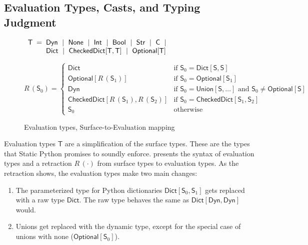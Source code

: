 \documentclass[english,cleveref,submission]{programming}
\makeatletter
\newcommand{\SP}{Static Python}
\newcommand{\defeq}{=}
\newcommand{\mfeq}{=}
\newcommand{\langmid}{~\mid~} %
\newenvironment{langarray}{\(\begin{array}{l@{\hspace{2mm}}c@{\hspace{2mm}}l}}{\end{array}\)}
\newcommand{\typefont}[1]{\mathsf{#1}}
\newcommand{\paramtype}[2]{#1[#2]}
\newcommand{\sptype}{\typefont{S}}
\newcommand{\spteval}{\typefont{T}}
\newcommand{\sptclass}{\typefont{C}}
\newcommand{\sptint}{\typefont{Int}}
\newcommand{\sptstr}{\typefont{Str}}
\newcommand{\sptbool}{\typefont{Bool}}
\newcommand{\sptdyn}{\typefont{Dyn}}
\newcommand{\sptnone}{\typefont{None}}
\newcommand{\sptoptional}[1]{\paramtype{\typefont{Optional}}{#1}}
\newcommand{\sptunion}[1]{\paramtype{\typefont{Union}}{#1}}
\newcommand{\sptrawpydict}{\typefont{Dict}}
\newcommand{\sptrawchkdict}{\typefont{CheckedDict}} %
\newcommand{\sptpydict}[2]{\paramtype{\sptrawpydict}{#1, #2}}
\newcommand{\sptchkdict}[2]{\paramtype{\sptrawchkdict}{#1, #2}}
\newcommand{\mfapply}[2]{#1\,(#2)}
\newcommand{\mffont}[1]{\mathit{#1}}
\newcommand{\mftypeF}[1]{\mfapply{\mffont{R}}{#1}} %
\makeatother
\begin{document}
\subsection{Evaluation Types, Casts, and Typing Judgment}
\label{s:eval-types}

\begin{figure}[t]
  \begin{langarray}
    \spteval & \defeq &
      \sptdyn \langmid
      \sptnone \langmid
      \sptint \langmid
      \sptbool \langmid
      \sptstr \langmid
      \sptclass \langmid
    \\ & &
      \sptrawpydict \langmid
      \sptchkdict{\spteval}{\spteval} \langmid
      \sptoptional{\spteval}
  \end{langarray}

  \bigskip
  \(
    \mftypeF{\sptype_0}
    \mfeq
    \left\{\begin{array}{ll}
      \sptrawpydict & \mbox{if $\sptype_0 = \sptpydict{\sptype}{\sptype}$}
    \\
      \sptoptional{\mftypeF{\sptype_1}} & \mbox{if $\sptype_0 = \sptoptional{\sptype_1}$}
    \\
      \sptdyn & \mbox{if $\sptype_0 = \sptunion{\sptype, \ldots}$ and $\sptype_0 \neq \sptoptional{\sptype}\!\!\!\!$}
    \\
      \sptchkdict{\mftypeF{\sptype_1}}{\mftypeF{\sptype_2}} & \mbox{if $\sptype_0 = \sptchkdict{\sptype_1}{\sptype_2}$}
    \\
      \sptype_0 & \mbox{otherwise}
    \end{array}\right.
  \)

  \caption{Evaluation types, Surface-to-Evaluation mapping}
  \label{f:surface-to-eval-types}
\end{figure}

Evaluation types $\spteval$ are a simplification of the surface types.
These are the types that \SP{} promises to soundly enforce.
 presents the syntax of evaluation types
and a retraction $\mftypeF{\cdot}$ from surface types to evaluation types.
As the retraction shows, the evaluation types make two main changes:
\begin{enumerate}
  \item
    The parameterized type for Python dictionaries
    $\sptpydict{\sptype_0}{\sptype_1}$ gets replaced with
    a raw type $\sptrawpydict$.
    The raw type behaves the same as $\sptpydict{\sptdyn}{\sptdyn}$ would.
  \item
    Unions get replaced with the dynamic type, except for the special case
    of unions with none ($\sptoptional{\sptype_0}$).
\end{enumerate}
\end{document}
